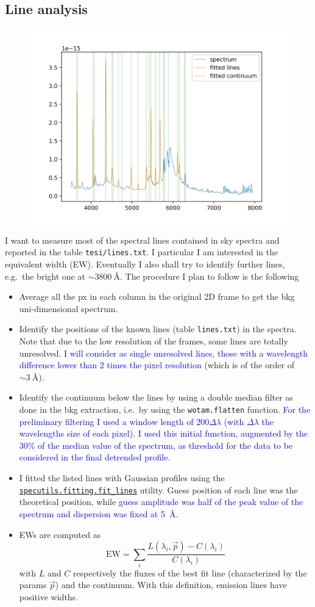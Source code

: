 \documentclass{article}
\newcommand{\arbitrario}[1]{\textcolor{blue}{#1}}
\begin{document}
\subsection{Line analysis}
	\begin{figure}[h!]
	\centering
	\includegraphics[width=.65\textwidth]{prova_fit}
\end{figure}
I want to measure most of the spectral lines contained in sky spectra and reported in the table \texttt{tesi/lines.txt}. I particular I am interested in the equivalent width (EW). Eventually I also shall try to identify further lines, e.g.\ the bright one at $\sim\SI{3800}{\angstrom}$. The procedure I plan to follow is the following
\begin{itemize}
	\item Average all the px in each column in the original 2D frame to get the bkg uni-dimensional spectrum.
	\item Identify the positions of the known lines (table \texttt{lines.txt}) in the spectra. Note that due to the low resolution of the frames, some lines are totally unresolved. \arbitrario{I will consider as single unresolved lines, those with a wavelength difference lower than 2 times the pixel resolution} (which is of the order of $\sim\SI{3}{\angstrom}$).
	\item Identify the continuum below the lines by using a double median filter as done in the bkg extraction, i.e.\ by using the \texttt{wotam.flatten} function. \arbitrario{For the preliminary filtering I used a window length of $200\Delta\lambda$ (with $\Delta\lambda$ the wavelengths size of each pixel). I used this initial function, augmented by the 30\% of the median value of the spectrum, as threshold for the data to be considered in the final detrended profile.}
	\item I fitted the listed lines with Gaussian profiles using the \href{https://specutils.readthedocs.io/en/stable/fitting.html}{\texttt{specutils.fitting.fit\_lines}} utility. Guess position of each line was the theoretical position, while \arbitrario{guess amplitude was half of the peak value of the spectrum and dispersion was fixed at \SI{5}{\angstrom}}.
	\item EWs are computed as
	\[ \text{EW} = \sum_i \frac{L(\lambda_i,\vec p)-C(\lambda_i)}{C(\lambda_i)}\]
	with $L$ and $C$ respectively the fluxes of the best fit line (characterized by the params $\vec p$) and the continuum. With this definition, emission lines have positive widths.
\end{itemize}
\end{document}
